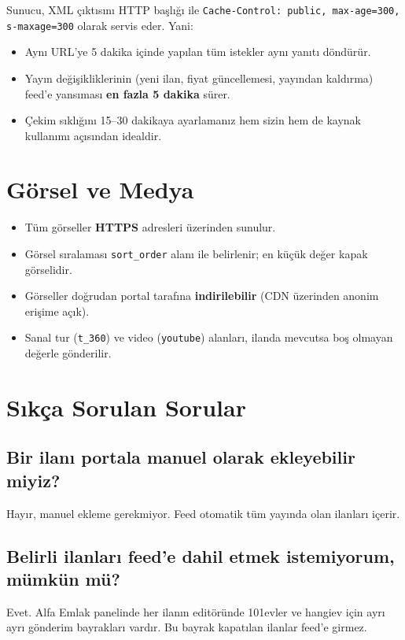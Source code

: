 \documentclass[11pt,a4paper]{article}
\begin{document}
Sunucu, XML çıktısını HTTP başlığı ile \texttt{Cache-Control: public, max-age=300, s-maxage=300} olarak servis eder. Yani:

\begin{itemize}[leftmargin=*]
\item Aynı URL'ye 5 dakika içinde yapılan tüm istekler aynı yanıtı döndürür.
\item Yayın değişikliklerinin (yeni ilan, fiyat güncellemesi, yayından kaldırma) feed'e yansıması \textbf{en fazla 5 dakika} sürer.
\item Çekim sıklığını 15--30 dakikaya ayarlamanız hem sizin hem de kaynak kullanımı açısından idealdir.
\end{itemize}

\section{Görsel ve Medya}

\begin{itemize}[leftmargin=*]
\item Tüm görseller \textbf{HTTPS} adresleri üzerinden sunulur.
\item Görsel sıralaması \texttt{sort\_order} alanı ile belirlenir; en küçük değer kapak görselidir.
\item Görseller doğrudan portal tarafına \textbf{indirilebilir} (CDN üzerinden anonim erişime açık).
\item Sanal tur (\texttt{t\_360}) ve video (\texttt{youtube}) alanları, ilanda mevcutsa boş olmayan değerle gönderilir.
\end{itemize}

\section{Sıkça Sorulan Sorular}

\subsection*{Bir ilanı portala manuel olarak ekleyebilir miyiz?}
Hayır, manuel ekleme gerekmiyor. Feed otomatik tüm yayında olan ilanları içerir.

\subsection*{Belirli ilanları feed'e dahil etmek istemiyorum, mümkün mü?}
Evet. Alfa Emlak panelinde her ilanın editöründe 101evler ve hangiev için ayrı ayrı gönderim bayrakları vardır. Bu bayrak kapatılan ilanlar feed'e girmez.
\end{document}
